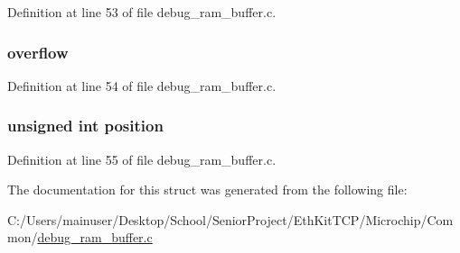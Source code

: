 Definition at line 53 of file debug\+\_\+ram\+\_\+buffer.\+c.

\hypertarget{struct_d_e_b_u_g___s_e_s_s_i_o_n_abc7578797f4d3fd99d662d13d11d037f}{}
\subsubsection[{overflow}]{ overflow}\label{struct_d_e_b_u_g___s_e_s_s_i_o_n_abc7578797f4d3fd99d662d13d11d037f}


Definition at line 54 of file debug\+\_\+ram\+\_\+buffer.\+c.

\hypertarget{struct_d_e_b_u_g___s_e_s_s_i_o_n_a1d7b72031fa39d396d531503904f337b}{}
\subsubsection[{position}]{\setlength{\rightskip}{0pt plus 5cm}unsigned int position}\label{struct_d_e_b_u_g___s_e_s_s_i_o_n_a1d7b72031fa39d396d531503904f337b}


Definition at line 55 of file debug\+\_\+ram\+\_\+buffer.\+c.



The documentation for this struct was generated from the following file\+:\begin{DoxyCompactItemize}
\item 
C\+:/\+Users/mainuser/\+Desktop/\+School/\+Senior\+Project/\+Eth\+Kit\+T\+C\+P/\+Microchip/\+Common/\hyperlink{debug__ram__buffer_8c}{debug\+\_\+ram\+\_\+buffer.\+c}\end{DoxyCompactItemize}
